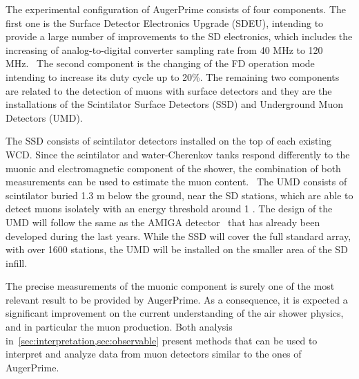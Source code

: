 The experimental configuration of AugerPrime consists of four components.
The first one is the Surface Detector Electronics Upgrade (SDEU), intending to provide
a large number of improvements to the SD electronics, which includes the increasing of
analog-to-digital converter sampling rate from 40 MHz to 120 MHz.~\cite{Suomijarvi:2017ixb}
The second component is the changing
of the FD operation mode intending to increase its duty cycle up to 20\%.
The remaining two components are related to the detection of muons with surface detectors and
they are the installations of the Scintilator Surface Detectors (SSD) and
Underground Muon Detectors (UMD).

The SSD consists of scintilator detectors installed on the top of each existing WCD.
Since the scintilator and water-Cherenkov tanks respond differently to the muonic and
electromagnetic component of the shower, the combination of both measurements
can be used to estimate the muon content.~\cite{Gonzalez:2016ora} 
The UMD consists of scintilator buried 1.3 m below the ground, near the SD stations,
which are able to detect muons isolately with an energy threshold around 1 \GeV. The design
of the UMD will follow the same as the AMIGA detector~\cite{Suarez:2013ecb,Wundheiler:2011zz,Platino:2011zz}
that has already been developed during the last years. While the SSD will cover the full
standard array, with over 1600 stations, the UMD will be installed on the smaller area
of the SD infill.

The precise measurements of the muonic component is surely one of the most relevant
result to be provided by AugerPrime. As a consequence, it is expected a significant
improvement on the current understanding of the air shower physics, and in particular
the muon production. Both analysis in~\cref{sec:interpretation,sec:observable}
present methods that can be used to interpret and analyze data from
muon detectors similar to the ones of AugerPrime.


